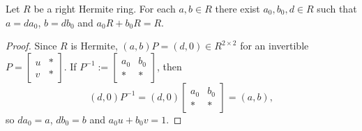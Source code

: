 \documentclass[10pt,a4paper]{amsart}
\begin{document}
\begin{lemma}\label{LLL:3}
Let $R$ be a right Hermite ring. For each $a,b\in R$ there exist $a_0,b_0, d\in R$ such that $a=da_0$, $b=db_0$ and  $a_0R+b_0R=R$.
\end{lemma}

\begin{proof}
Since $R$ is  Hermite, $(a,b)P=(d,0)\in R^{2\times 2}$ for an invertible
$P=\left[\begin{array}{cc}
u & * \\
v & *
\end{array}\right]$. If
$P^{-1}:=\left[\begin{array}{cc}
          a_0 & b_0 \\
          * & *
\end{array}\right]$,  then
\[
\textstyle
(d,0)P^{-1}=(d,0)\left[\begin{array}{cc}
          a_0 & b_0 \\
          * & *
        \end{array}\right]=(a,b),
\]
so   $da_0=a$, $db_0=b$ and $a_0u+b_0v=1$.
\end{proof}
\end{document}
